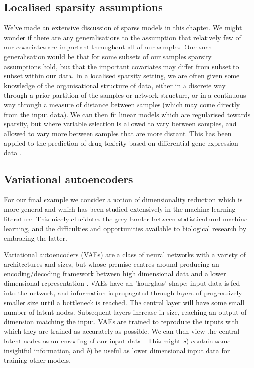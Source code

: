 \documentclass[thesis.tex]{subfiles}
\begin{document}
\subsection{Localised sparsity assumptions}
We've made an extensive discussion of sparse models in this chapter. We might wonder if there are any generalisations to the assumption that relatively few of our covariates are important throughout all of our samples. One such generalisation would be that for some subsets of our samples sparsity assumptions hold, but that the important covariates may differ from subset to subset within our data. In a localised sparsity setting, we are often given some knowledge of the organisational structure of data, either in a discrete way through a prior partition of the samples or network structure, or in a continuous way through a measure of distance between samples (which may come directly from the input data). We can then fit linear models which are regularised towards sparsity, but where variable selection is allowed to vary between samples, and allowed to vary more between samples that are more distant. This has been applied to the prediction of drug toxicity based on differential gene expression data \citep{yamada_localized_2017}. 

\subsection{Variational autoencoders}
For our final example we consider a notion of dimensionality reduction which is more general and which has been studied extensively in the machine learning literature. This nicely elucidates the grey border between statistical and machine learning, and the difficulties and opportunities available to biological research by embracing the latter. 

Variational autoencoders (VAEs) are a class of neural networks with a variety of architectures and sizes, but whose premise centres around producing an encoding/decoding framework between high dimensional data and a lower dimensional representation \citep{kingma_auto-encoding_2022}. VAEs have an 'hourglass' shape: input data is fed into the network, and information is propagated through layers of progressively smaller size until a bottleneck is reached. The central layer will have some small number of latent nodes. Subsequent layers increase in size, reaching an output of dimension matching the input. VAEs are trained to reproduce the inputs with which they are trained as accurately as possible. We can then view the central latent nodes as an encoding of our input data \citep{zheng_understanding_2019}. This might \textit{a}) contain some insightful information, and \textit{b}) be useful as lower dimensional input data for training other models. 
\end{document}
